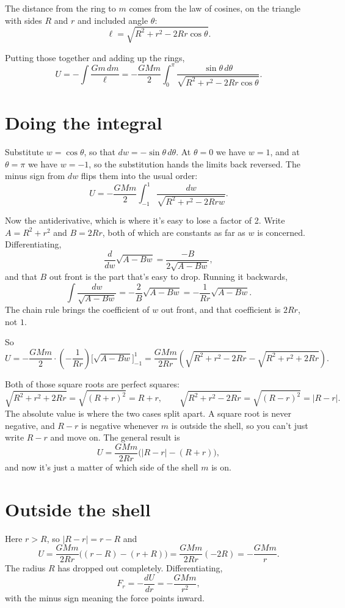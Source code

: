 \documentclass[11pt]{article}
\begin{document}
The distance from the ring to $m$ comes from the law of cosines, on the triangle with
sides $R$ and $r$ and included angle $\theta$:
\[
\ell = \sqrt{R^2 + r^2 - 2Rr\cos\theta}.
\]

Putting those together and adding up the rings,
\[
U = -\int \frac{Gm\,dm}{\ell}
  = -\frac{GMm}{2}\int_0^{\pi} \frac{\sin\theta\,d\theta}{\sqrt{R^2+r^2-2Rr\cos\theta}} .
\]

\section*{Doing the integral}

Substitute $w = \cos\theta$, so that $dw = -\sin\theta\,d\theta$. At $\theta = 0$ we have
$w = 1$, and at $\theta = \pi$ we have $w = -1$, so the substitution hands the limits back
reversed. The minus sign from $dw$ flips them into the usual order:
\[
U = -\frac{GMm}{2}\int_{-1}^{1} \frac{dw}{\sqrt{R^2+r^2-2Rrw}} .
\]

Now the antiderivative, which is where it's easy to lose a factor of 2. Write
$A = R^2 + r^2$ and $B = 2Rr$, both of which are constants as far as $w$ is concerned.
Differentiating,
\[
\frac{d}{dw}\sqrt{A - Bw} = \frac{-B}{2\sqrt{A-Bw}},
\]
and that $B$ out front is the part that's easy to drop. Running it backwards,
\[
\int \frac{dw}{\sqrt{A-Bw}} = -\frac{2}{B}\sqrt{A-Bw} = -\frac{1}{Rr}\sqrt{A-Bw} .
\]
The chain rule brings the coefficient of $w$ out front, and that coefficient is $2Rr$,
not $1$.

So
\[
U = -\frac{GMm}{2}\cdot\left(-\frac{1}{Rr}\right)\Big[\sqrt{A-Bw}\Big]_{-1}^{1}
  = \frac{GMm}{2Rr}\left(\sqrt{R^2+r^2-2Rr} - \sqrt{R^2+r^2+2Rr}\right).
\]

Both of those square roots are perfect squares:
\[
\sqrt{R^2+r^2+2Rr} = \sqrt{(R+r)^2} = R + r,
\qquad
\sqrt{R^2+r^2-2Rr} = \sqrt{(R-r)^2} = |R-r| .
\]
The absolute value is where the two cases split apart. A square root is never negative,
and $R - r$ is negative whenever $m$ is outside the shell, so you can't just write $R-r$
and move on. The general result is
\[
U = \frac{GMm}{2Rr}\Big(|R-r| - (R+r)\Big),
\]
and now it's just a matter of which side of the shell $m$ is on.

\section*{Outside the shell}

Here $r > R$, so $|R-r| = r - R$ and
\[
U = \frac{GMm}{2Rr}\big((r-R) - (r+R)\big)
  = \frac{GMm}{2Rr}(-2R)
  = -\frac{GMm}{r} .
\]
The radius $R$ has dropped out completely. Differentiating,
\[
F_r = -\frac{dU}{dr} = -\frac{GMm}{r^2},
\]
with the minus sign meaning the force points inward.
\end{document}
